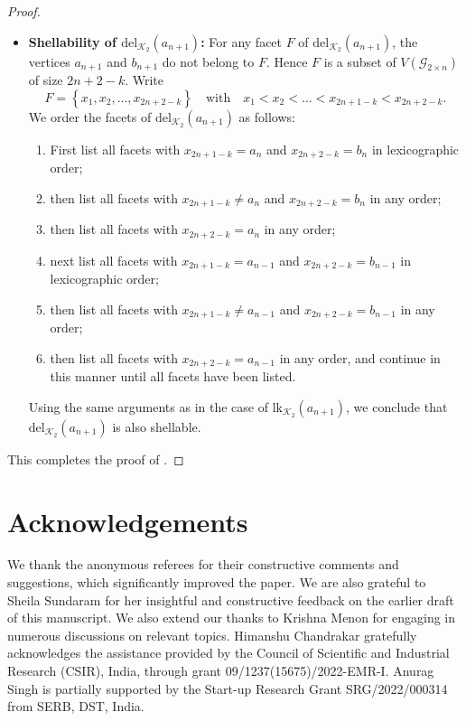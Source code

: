 \documentclass[11pt,reqno,a4paper]{amsart}
\theoremstyle{definition}
\theoremstyle{theorem}
\newcommand{\twogg}{\mathcal{G}_{2\times n}}
\newcommand{\lno}{\left(}
\newcommand{\rno}{\right)}
\newcommand{\lcu}{\left\{}
\newcommand{\rcu}{\right\}}
\newcommand{\K}{\mathcal{K}}
\newcommand{\lk}{\mathrm{lk}}
\newcommand{\del}{\mathrm{del}}
\theoremstyle{remark}
\begin{document}
\begin{proof}
\begin{enumerate}
\begin{itemize}
			\item \textbf{Shellability of $\del_{\K_2}\lno a_{n+1} \rno$:}
			For any facet $F$ of $\del_{\K_2}\lno a_{n+1} \rno$, the vertices $a_{n+1}$ and $b_{n+1}$ do not belong to $F$. Hence $F$ is a subset of $V\lno \twogg \rno$ of size $2n+2-k$. Write
\[ F = \lcu x_1, x_2, \dots, x_{2n+2-k} \rcu
\quad\text{with}\quad
x_1 < x_2 < \dots < x_{2n+1-k} < x_{2n+2-k}.
\]
We order the facets of $\del_{\K_2}\lno a_{n+1} \rno$ as follows:
\begin{enumerate}[label = \roman*.]
\item First list all facets with $x_{2n+1-k}=a_n$ and $x_{2n+2-k}=b_n$ in lexicographic order;
\item then list all facets with $x_{2n+1-k}\neq a_n$ and $x_{2n+2-k}=b_n$ in any order;
\item then list all facets with $x_{2n+2-k}=a_n$ in any order;
\item next list all facets with $x_{2n+1-k}=a_{n-1}$ and $x_{2n+2-k}=b_{n-1}$ in lexicographic order;
\item then list all facets with $x_{2n+1-k}\neq a_{n-1}$ and $x_{2n+2-k}=b_{n-1}$ in any order;
\item then list all facets with $x_{2n+2-k}=a_{n-1}$ in any order, and continue in this manner until all facets have been listed.
\end{enumerate}

Using the same arguments as in the case of $\lk_{\K_2}\lno a_{n+1} \rno$, we conclude that $\del_{\K_2}\lno a_{n+1} \rno$ is also shellable.	
		\end{itemize}
		\end{enumerate}
		
		This completes the proof of .
	\end{proof}

    
\section*{Acknowledgements} We thank the anonymous referees for their constructive comments and suggestions, which significantly improved the paper. We are also grateful to Sheila Sundaram for her insightful and constructive feedback on the earlier draft of this manuscript. We also extend our thanks to Krishna Menon for engaging in numerous discussions on relevant topics. Himanshu Chandrakar gratefully acknowledges the assistance provided by the Council of Scientific and Industrial Research (CSIR), India, through grant 09/1237(15675)/2022-EMR-I. Anurag Singh is partially supported by the Start-up Research Grant SRG/2022/000314 from SERB, DST, India.
\end{document}
